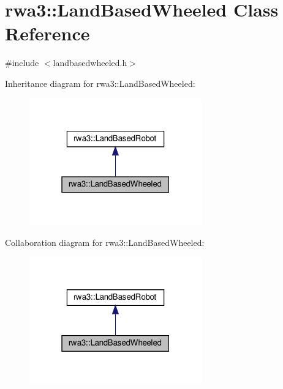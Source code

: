 \hypertarget{classrwa3_1_1_land_based_wheeled}{}\section{rwa3\+:\+:Land\+Based\+Wheeled Class Reference}
\label{classrwa3_1_1_land_based_wheeled}


{\ttfamily \#include $<$landbasedwheeled.\+h$>$}



Inheritance diagram for rwa3\+:\+:Land\+Based\+Wheeled\+:\nopagebreak
\begin{figure}[H]
\begin{center}
\leavevmode
\includegraphics[width=211pt]{classrwa3_1_1_land_based_wheeled__inherit__graph}
\end{center}
\end{figure}


Collaboration diagram for rwa3\+:\+:Land\+Based\+Wheeled\+:\nopagebreak
\begin{figure}[H]
\begin{center}
\leavevmode
\includegraphics[width=211pt]{classrwa3_1_1_land_based_wheeled__coll__graph}
\end{center}
\end{figure}
